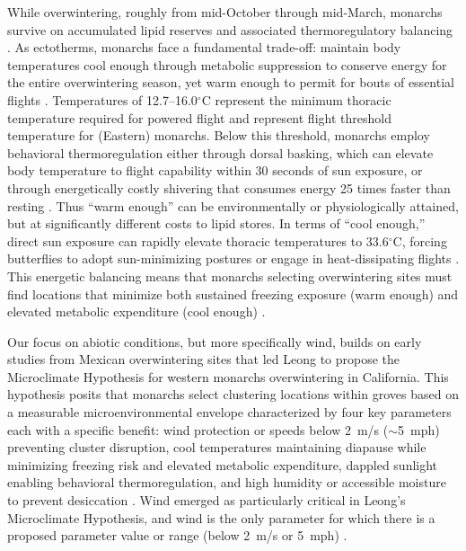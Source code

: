 \documentclass[insects,article,submit,pdftex,moreauthors]{Definitions/mdpi}
\begin{document}
While overwintering, roughly from mid-October through mid-March, monarchs survive on accumulated lipid reserves and associated thermoregulatory balancing \cite{chaplinEnergyReservesMetabolic1982,mastersMonarchButterflyDanaus1988}. As ectotherms, monarchs face a fundamental trade-off: maintain body temperatures cool enough through metabolic suppression to conserve energy for the entire overwintering season, yet warm enough to permit for bouts of essential flights \cite{mastersMonarchButterflyDanaus1988,chaplinEnergyReservesMetabolic1982,kammerThoracicTemperatureShivering1970,alonso-mejiaInfluenceTemperatureSurface1992}. Temperatures of 12.7--16.0$^{\circ}$C represent the minimum thoracic temperature required for powered flight \cite{mastersMonarchButterflyDanaus1988} and represent flight threshold temperature for (Eastern) monarchs. Below this threshold, monarchs employ behavioral thermoregulation either through dorsal basking, which can elevate body temperature to flight capability within 30 seconds of sun exposure, or through energetically costly shivering that consumes energy 25 times faster than resting \cite{mastersMonarchButterflyDanaus1988}. Thus ``warm enough'' can be environmentally or physiologically attained, but at significantly different costs to lipid stores. In terms of ``cool enough,'' direct sun exposure can rapidly elevate thoracic temperatures to 33.6$^{\circ}$C, forcing butterflies to adopt sun-minimizing postures or engage in heat-dissipating flights \cite{barkerEffectPhotoperiodTemperature1976}. This energetic balancing means that monarchs selecting overwintering sites must find locations that minimize both sustained freezing exposure (warm enough) and elevated metabolic expenditure (cool enough) \cite{mastersMonarchButterflyDanaus1988,alonso-mejiaInfluenceTemperatureSurface1992,calvertEffectRainSnow1983,andersonFreezeprotectionOverwinteringMonarch1996}.

Our focus on abiotic conditions, but more specifically wind, builds on early studies from Mexican overwintering sites that led Leong \cite{leongMicroenvironmentalFactorsAssociated1990} to propose the Microclimate Hypothesis for western monarchs overwintering in California. This hypothesis posits that monarchs select clustering locations within groves based on a measurable microenvironmental envelope characterized by four key parameters each with a specific benefit: wind protection or speeds below 2~m/s ($\sim$5~mph) preventing cluster disruption, cool temperatures maintaining diapause while minimizing freezing risk and elevated metabolic expenditure, dappled sunlight enabling behavioral thermoregulation, and high humidity or accessible moisture to prevent desiccation \cite{leongMicroenvironmentalFactorsAssociated1990,leongUseMultivariateAnalyses1991}. Wind emerged as particularly critical in Leong's Microclimate Hypothesis, and wind is the only parameter for which there is a proposed parameter value or range (below 2~m/s or 5~mph) \cite{leongMicroenvironmentalFactorsAssociated1990,leongUseMultivariateAnalyses1991}.
\end{document}
